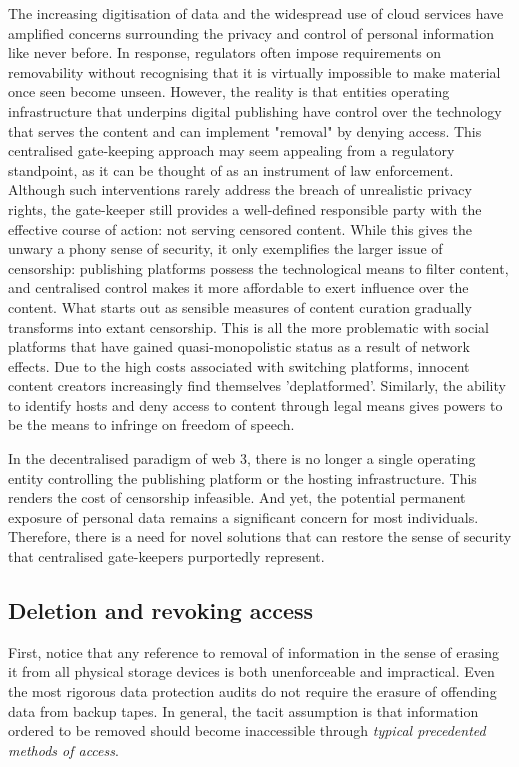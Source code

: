 The increasing digitisation of data and the widespread use of cloud services have amplified concerns surrounding the privacy and control of personal information like never before.  
In response, regulators often impose requirements on removability without recognising that it is virtually impossible to make material once seen become unseen.
However, the reality is that entities operating infrastructure that underpins digital publishing have control over the technology that serves the content and can implement "removal" by denying access.
This centralised gate-keeping approach may seem appealing from a regulatory standpoint, as it can be thought of as an instrument of law enforcement. Although such interventions rarely address the breach of unrealistic privacy rights, the gate-keeper still provides a well-defined responsible party with the effective course of action: not serving censored content.
While this gives the unwary a phony sense of security, it only exemplifies the larger issue of censorship: publishing platforms possess the technological means to filter content, and centralised control makes it more affordable to exert influence over the content.  What starts out as sensible measures of content curation gradually transforms into extant censorship. This is all the more problematic with social platforms that have gained quasi-monopolistic status as a result of network effects. Due to the high costs associated with switching platforms, innocent content creators increasingly find themselves 'deplatformed'. Similarly, the ability to identify hosts and deny access to content through legal means gives powers to be the means to infringe on freedom of speech. 

In the decentralised paradigm of web 3, there is no longer a single operating entity controlling the publishing platform or the hosting infrastructure. This renders the cost of censorship infeasible. And yet, the potential permanent exposure of personal data remains a significant concern for most individuals. Therefore, there is a need for novel solutions that can restore the sense of security that centralised gate-keepers purportedly represent. 

\subsection{Deletion and revoking access}

First, notice that any reference to removal of information in the sense of erasing it from all physical storage devices is both unenforceable and impractical. Even the most rigorous data protection audits do not require the erasure of offending data from backup tapes. In general, the tacit assumption is that information ordered to be removed should become inaccessible through \emph{typical precedented methods of access}.

